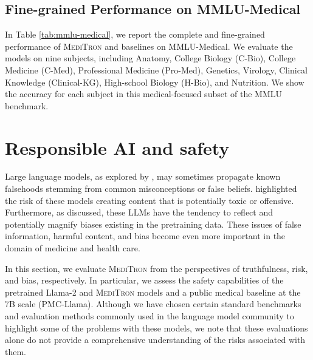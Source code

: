 \documentclass{article}
\newcommand{\llama}{\textnormal{Llama}}
\newcommand{\mtron}{\textsc{MediTron}\xspace}
\begin{document}
\subsection{Fine-grained Performance on MMLU-Medical}
In Table \ref{tab:mmlu-medical}, we report the complete and fine-grained performance of \mtron and baselines on MMLU-Medical. We evaluate the models on nine subjects, including Anatomy, College Biology (C-Bio), College Medicine (C-Med), Professional Medicine (Pro-Med), Genetics, Virology, Clinical Knowledge (Clinical-KG), High-school Biology (H-Bio), and Nutrition. We show the accuracy for each subject in this medical-focused subset of the MMLU benchmark. 

\section{Responsible AI and safety}
Large language models, as explored by \citet{lin-etal-2022-truthfulqa}, may sometimes propagate known falsehoods stemming from common misconceptions or false beliefs. \citet{hartvigsen-etal-2022-toxigen} highlighted the risk of these models creating content that is potentially toxic or offensive. Furthermore, as \citet{Dhamala_2021} discussed, these LLMs have the tendency to reflect and potentially magnify biases existing in the pretraining data. These issues of false information, harmful content, and bias become even more important in the domain of medicine and health care.

In this section, we evaluate \mtron from the perspectives of truthfulness, risk, and bias, respectively. In particular, we assess the safety capabilities of the pretrained \llama-2 and \mtron models and a public medical baseline at the 7B scale (PMC-\llama). Although we have chosen certain standard benchmarks and evaluation methods commonly used in the language model community to highlight some of the problems with these models, we note that these evaluations alone do not provide a comprehensive understanding of the risks associated with them.
\end{document}
